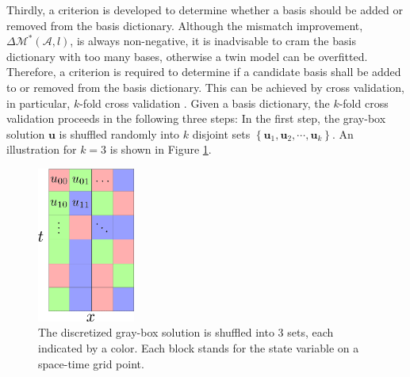 Thirdly, a criterion is developed to determine whether a basis should be added or removed from
the basis dictionary. 
Although the mismatch improvement, $\Delta \mathcal{M}^*\left(\mathcal{A}, l\right)$, is always
non-negative, it is inadvisable to cram the basis dictionary with too many bases,
otherwise a twin model can be overfitted.
Therefore, a criterion is required to determine if a candidate basis shall be added to or 
removed from the basis dictionary. This can be achieved by cross validation,
in particular, $k$-fold cross validation \cite{cross validation}.
Given a basis dictionary, the $k$-fold cross validation proceeds in the following three steps:
In the first step, the gray-box solution $\boldsymbol{u}$ is shuffled randomly into $k$ disjoint sets
$\left\{\boldsymbol{u}_1 , \boldsymbol{u}_2, \cdots, \boldsymbol{u}_k\right\}$.
An illustration for $k=3$ is shown in Figure \ref{fig: shuffle}.
\begin{figure}[htbp]
    \begin{center}
        \includegraphics[width=3.2cm]{../shuffle_1.png}
        \caption{The discretized 
                 gray-box solution is shuffled into $3$ sets, each indicated by a color. 
                 Each block stands for the state variable on a space-time grid point.}
        \label{fig: shuffle}
    \end{center}
\end{figure}

